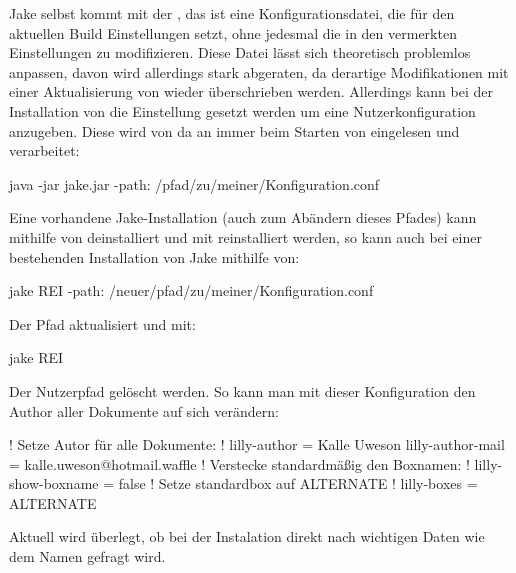 \begin{bemerkung}[Standartkonfigurationsdateien]
    Jake selbst kommt mit der , das ist eine Konfigurationsdatei, die für den aktuellen Build Einstellungen setzt, ohne jedesmal die in den  vermerkten Einstellungen zu modifizieren. Diese Datei lässt sich theoretisch problemlos anpassen, davon wird allerdings stark abgeraten, da derartige Modifikationen mit einer Aktualisierung von \Jake wieder überschrieben werden. Allerdings kann bei der Installation von \Jake die Einstellung  gesetzt werden um eine Nutzerkonfiguration anzugeben. Diese wird von da an immer beim Starten von \Jake eingelesen und verarbeitet:
    \begin{bash*}
java -jar jake.jar -path: /pfad/zu/meiner/Konfiguration.conf
    \end{bash*}
    Eine vorhandene Jake-Installation (auch zum Abändern dieses Pfades) kann mithilfe von  deinstalliert und mit  reinstalliert werden, so kann auch bei einer bestehenden Installation von Jake mithilfe von:
    \begin{bash*}
jake REI -path: /neuer/pfad/zu/meiner/Konfiguration.conf
    \end{bash*}
    Der Pfad aktualisiert und mit:
    \begin{bash*}
jake REI
    \end{bash*}
    Der Nutzerpfad gelöscht werden. So kann man mit dieser Konfiguration den Author aller Dokumente auf sich verändern:
    \begin{gepard}
! Setze Autor für alle Dokumente: !
lilly-author       = Kalle Uweson
lilly-author-mail  = kalle.uweson@hotmail.waffle
! Verstecke standardmäßig den Boxnamen: !
lilly-show-boxname = false
! Setze standardbox auf ALTERNATE !
lilly-boxes        = ALTERNATE
    \end{gepard}
    Aktuell wird überlegt, ob bei der Instalation direkt nach wichtigen Daten wie dem Namen gefragt wird.
\end{bemerkung}

